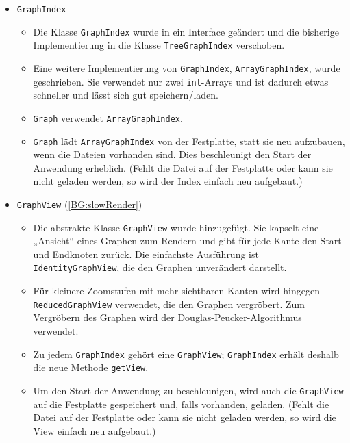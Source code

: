 \documentclass[a4paper, 11pt]{article}
\newcommand{\code}[1]{\texttt{#1}}
\begin{document}
\begin{itemize}
\item \code{GraphIndex}
  \begin{itemize}
  \item Die Klasse \code{GraphIndex} wurde in ein Interface geändert und die bisherige Implementierung in die Klasse \code{TreeGraphIndex} verschoben.
  \item Eine weitere Implementierung von \code{GraphIndex}, \code{ArrayGraphIndex}, wurde geschrieben.
  Sie verwendet nur zwei \code{int}-Arrays und ist dadurch etwas schneller und lässt sich gut speichern/laden.
  \item \code{Graph} verwendet \code{ArrayGraphIndex}.
  \item \code{Graph} lädt \code{ArrayGraphIndex} von der Festplatte, statt sie neu aufzubauen, wenn die Dateien vorhanden sind.
    Dies beschleunigt den Start der Anwendung erheblich.
    (Fehlt die Datei auf der Festplatte oder kann sie nicht geladen werden, so wird der Index einfach neu aufgebaut.)
  \end{itemize}
\item\label{change:graphView} \code{GraphView} (\ref{BG:slowRender})
  \begin{itemize}
  \item Die abstrakte Klasse \code{GraphView} wurde hinzugefügt.
    Sie kapselt eine „Ansicht“ eines Graphen zum Rendern und gibt für jede Kante den Start- und Endknoten zurück.
    Die einfachste Ausführung ist \code{IdentityGraphView}, die den Graphen unverändert darstellt.
  \item Für kleinere Zoomstufen mit mehr sichtbaren Kanten wird hingegen \code{ReducedGraphView} verwendet, die den Graphen vergröbert.
    Zum Vergröbern des Graphen wird der Douglas-Peucker-Algorithmus verwendet. %
  \item Zu jedem \code{GraphIndex} gehört eine \code{GraphView};
    \code{GraphIndex} erhält deshalb die neue Methode \code{getView}.
  \item Um den Start der Anwendung zu beschleunigen, wird auch die \code{GraphView} auf die Festplatte gespeichert und, falls vorhanden, geladen.
    (Fehlt die Datei auf der Festplatte oder kann sie nicht geladen werden, so wird die View einfach neu aufgebaut.)
  \end{itemize}
  

\end{itemize}
\end{document}
